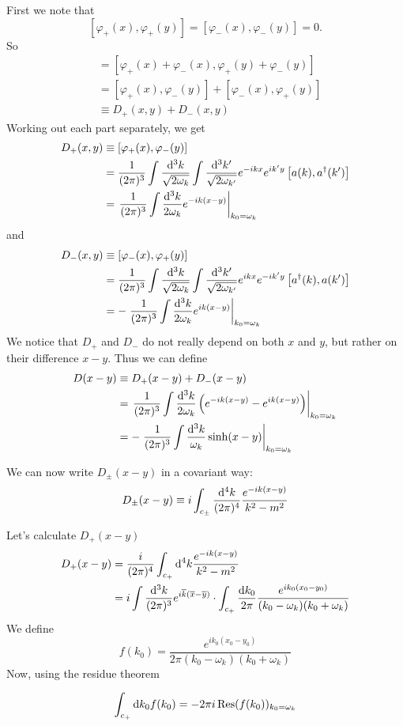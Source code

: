 First we note that
\[ [\varphi_+(x),\varphi_+(y)] = [\varphi_-(x),\varphi_-(y)] = 0. \]
So
\begin{align*}
[\varphi(x), \varphi(y)] &= [\varphi_+(x)+\varphi_-(x), \varphi_+(y) + \varphi_-(y)] \\
&= [\varphi_+(x), \varphi_-(y)] + [\varphi_-(x), \varphi_+(y)] \\
&\equiv D_+(x,y) + D_-(x,y)
\end{align*}
Working out each part separately, we get
\begin{align*}
D_+(x,y) &\equiv [\varphi_+(x), \varphi_-(y)]\\
&= \frac{1}{(2\pi)^{3}} \int \frac{\operatorname{d \!}{^{3}k}}{\sqrt{2\omega_k}} \int \frac{\operatorname{d \!}{^{3}k'}}{\sqrt{2\omega_{k'}}} e^{-ikx}e^{ik'y}\left[a(k), a^\dagger(k')\right] \\
&= \left.\frac{1}{(2\pi)^{3}} \int \frac{\operatorname{d \!}{^{3}k}}{2\omega_k} e^{-ik(x-y)}\right|_{k_0 = \omega_k}
\end{align*}
and
\begin{align*}
D_-(x,y) &\equiv [\varphi_-(x), \varphi_+(y)]\\
&= \frac{1}{(2\pi)^{3}} \int \frac{\operatorname{d \!}{^{3}k}}{\sqrt{2\omega_k}} \int \frac{\operatorname{d \!}{^{3}k'}}{\sqrt{2\omega_{k'}}} e^{ikx}e^{-ik'y}\left[a^\dagger(k), a(k')\right] \\
&= -\left.\frac{1}{(2\pi)^{3}} \int \frac{\operatorname{d \!}{^{3}k}}{2\omega_k} e^{ik(x-y)}\right|_{k_0 = \omega_k}
\end{align*}
We notice that $D_+$ and $D_-$ do not really depend on both $x$ and $y$, but rather on their difference $x-y$. Thus we can define
\begin{align*}
D(x-y) &\equiv D_+(x-y) + D_-(x-y) \\
&= \left.\frac{1}{(2\pi)^3}\int \frac{\operatorname{d \!}{^3k}}{2\omega_k}\left( e^{-ik(x-y)} - e^{ik(x-y)} \right)\right|_{k_0=\omega_k} \\
&= - \left.\frac{1}{(2\pi)^3}\int \frac{\operatorname{d \!}{^3k}}{\omega_k}\sinh(x-y)\right|_{k_0=\omega_k}
\end{align*}


We can now write $D_\pm(x-y)$ in a covariant way:
\[ D_\pm(x-y) \equiv i \int_{c_\pm}\frac{\operatorname{d \!}{^4k}}{(2\pi)^4}\frac{e^{-ik(x-y)}}{k^2-m^2} \]



Let's calculate $D_+(x-y)$
\begin{align*}
D_+(x-y) &= \frac{i}{(2\pi)^4}\int_{c_+}\operatorname{d \!}{^4k}\frac{e^{-ik(x-y)}}{k^2-m^2} \\
&= i \int \frac{\operatorname{d \!}{^3k}}{(2\pi)^3}e^{i \overline{k}(\overline{x}- \overline{y})} \cdot \int_{c_+} \frac{\operatorname{d \!}{k_0}}{2\pi} \frac{e^{ik_0(x_0-y_0)}}{(k_0-\omega_k)(k_0+\omega_k)}
\end{align*}
We define
\[ f(k_0) = \frac{e^{ik_0(x_0-y_0)}}{2\pi(k_0-\omega_k)(k_0+\omega_k)} \]
Now, using the residue theorem
\begin{eigenschap}
\[ \int_{c_+}\operatorname{d \!}{k_0}f(k_0) = -2\pi i \operatorname{Res}(f(k_0))_{k_0=\omega_k} \]
\end{eigenschap}


